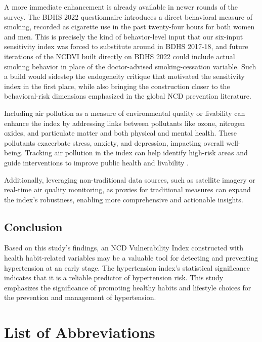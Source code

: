 \documentclass[
  12pt,
  a4paper]{article}
\begin{document}
A more immediate enhancement is already available in newer rounds of the survey. The BDHS 2022 questionnaire introduces a direct behavioral measure of smoking, recorded as cigarette use in the past twenty-four hours for both women and men. This is precisely the kind of behavior-level input that our six-input sensitivity index was forced to substitute around in BDHS 2017-18, and future iterations of the NCDVI built directly on BDHS 2022 could include actual smoking behavior in place of the doctor-advised smoking-cessation variable. Such a build would sidestep the endogeneity critique that motivated the sensitivity index in the first place, while also bringing the construction closer to the behavioral-risk dimensions emphasized in the global NCD prevention literature.

Including air pollution as a measure of environmental quality or livability can enhance the index by addressing links between pollutants like ozone, nitrogen oxides, and particulate matter and both physical and mental health. These pollutants exacerbate stress, anxiety, and depression, impacting overall well-being. Tracking air pollution in the index can help identify high-risk areas and guide interventions to improve public health and livability \citep{carlisle2001exercise, cai2016associations}.

Additionally, leveraging non-traditional data sources, such as satellite imagery or real-time air quality monitoring, as proxies for traditional measures can expand the index's robustness, enabling more comprehensive and actionable insights.

\subsection{Conclusion}\label{conclusion}

Based on this study's findings, an NCD Vulnerability Index constructed with health habit-related variables may be a valuable tool for detecting and preventing hypertension at an early stage. The hypertension index's statistical significance indicates that it is a reliable predictor of hypertension risk. This study emphasizes the significance of promoting healthy habits and lifestyle choices for the prevention and management of hypertension.

\section*{List of Abbreviations}\label{list-of-abbreviations}
\end{document}
